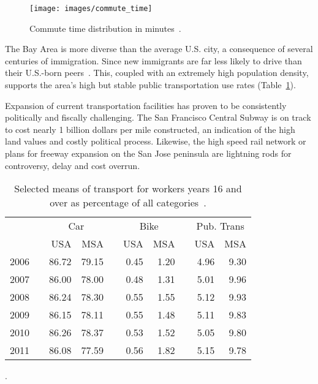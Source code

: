 \documentclass[12pt]{article}
\begin{document}
\begin{figure}
\begin{center}
\texttt{[image: images/commute\_time]}
\caption{Commute time distribution in minutes~\citep{USACENSUS}.}
\label{fig:commute}
\end{center}
\end{figure}

The Bay Area is more diverse than the average U.S. city, a consequence of several centuries of immigration. Since new immigrants are far less likely to drive than their U.S.-born peers~\citep{pisarski2006commuting}. This, coupled with an extremely high population density, supports the area's high but stable public transportation use rates (Table~\ref{table:modes}). 

Expansion of current transportation facilities has proven to be consistently politically and fiscally challenging. The San Francisco Central Subway is on track to cost nearly 1 billion dollars per mile constructed, an indication of the high land values and costly political process. Likewise, the high speed rail network or plans for freeway expansion on the San Jose peninsula are lightning rods for controversy, delay and cost overrun. 


\begin{table}
\begin{center}
 \begin{tabular}{rrrrrrrrrr}
\multicolumn{2}{c}{~} & \multicolumn{2}{c}{Car} & &\multicolumn{2}{c}{Bike} & & \multicolumn{2}{c}{Pub. Trans}  \\
      & & USA   & MSA   &  & USA   & MSA  &  &  USA   & MSA \\
       \cline{3-4}\cline{6-7}\cline{9-10}
 2006 & & 86.72 & 79.15 &  & 0.45  & 1.20 &  &  4.96  & 9.30 \\
 2007 & & 86.00 & 78.00 &  & 0.48  & 1.31 &  &  5.01  & 9.96 \\
 2008 & & 86.24 & 78.30 &  & 0.55  & 1.55 &  &  5.12  & 9.93 \\
 2009 & & 86.15 & 78.11 &  & 0.55  & 1.48 &  &  5.11  & 9.83 \\
 2010 & & 86.26 & 78.37 &  & 0.53  & 1.52 &  &  5.05  & 9.80 \\
 2011 & & 86.08 & 77.59 &  & 0.56  & 1.82 &  &  5.15  & 9.78 \\
 \end{tabular}
 \caption{Selected means of transport for workers years 16 and over as percentage of all categories~\citep{DOT2009NHTS}.}
 \label{table:modes}. 
 \end{center}
\end{table}
\end{document}
